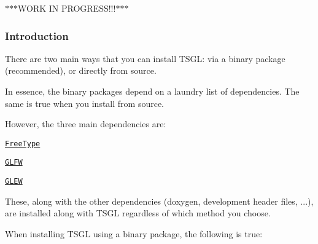 $\ast$$\ast$$\ast$\-W\-O\-R\-K I\-N P\-R\-O\-G\-R\-E\-S\-S!!!$\ast$$\ast$$\ast$

\subsubsection*{Introduction}

There are two main ways that you can install T\-S\-G\-L\-: via a binary package (recommended), or directly from source.

In essence, the binary packages depend on a laundry list of dependencies. The same is true when you install from source.

However, the three main dependencies are\-:


\begin{DoxyItemize}
\item \href{https://www.freetype.org/download.html}{\tt Free\-Type}
\item \href{https://www.glfw.org/download.html}{\tt G\-L\-F\-W}
\item \href{https://downloads.sourceforge.net/project/glew/glew/1.12.0/glew-1.12.0.zip}{\tt G\-L\-E\-W}
\end{DoxyItemize}

These, along with the other dependencies (doxygen, development header files, ...), are installed along with T\-S\-G\-L regardless of which method you choose.

When installing T\-S\-G\-L using a binary package, the following is true\-:


